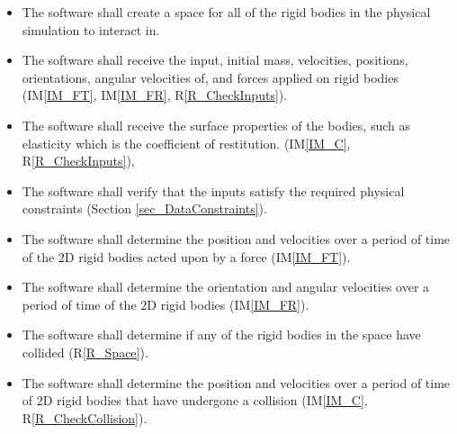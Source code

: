 \documentclass[12pt]{article}
\newcommand{\iref}[1]{IM\ref{#1}}
\newcounter{reqnum} %
\newcommand{\rref}[1]{R\ref{#1}}
\begin{document}
\noindent
\begin{itemize}

\item[R\refstepcounter{reqnum}\thereqnum \label{R_Space}:] The software shall
  create a space for all of the rigid bodies in the physical simulation to
  interact in.
\item[R\refstepcounter{reqnum}\thereqnum \label{R_Rigid}:] The software shall
  receive the input, initial mass, velocities, positions, orientations, angular
  velocities of, and forces applied on rigid bodies (\iref{IM_FT}, \iref{IM_FR},
  \rref{R_CheckInputs}).
\item[R\refstepcounter{reqnum}\thereqnum \label{R_Shape}:] The software shall
  receive the surface properties of the bodies, such as  elasticity which is the coefficient of restitution. 
  (\iref{IM_C}, \rref{R_CheckInputs}),
\item[R\refstepcounter{reqnum}\thereqnum \label{R_CheckInputs}:] The software
  shall verify that the inputs satisfy the required physical constraints
  (Section \ref{sec_DataConstraints}).
\item[R\refstepcounter{reqnum}\thereqnum \label{R_Force}:] The software shall
  determine the position and velocities over a period of time of the 2D rigid
  bodies acted upon by a force (\iref{IM_FT}).
\item[R\refstepcounter{reqnum}\thereqnum \label{R_Rotation}:] The software shall
  determine the orientation and angular velocities over a period of time of the
  2D rigid bodies (\iref{IM_FR}).
\item[R\refstepcounter{reqnum}\thereqnum \label{R_CheckCollision}:] The software
  shall determine if any of the rigid bodies in the space have collided
  (\rref{R_Space}).
\item[R\refstepcounter{reqnum}\thereqnum \label{R_Collision}:] The software
  shall determine the position and velocities over a period of time of 2D rigid
  bodies that have undergone a collision (\iref{IM_C}, \rref{R_CheckCollision}).


\end{itemize} 

\end{document}

